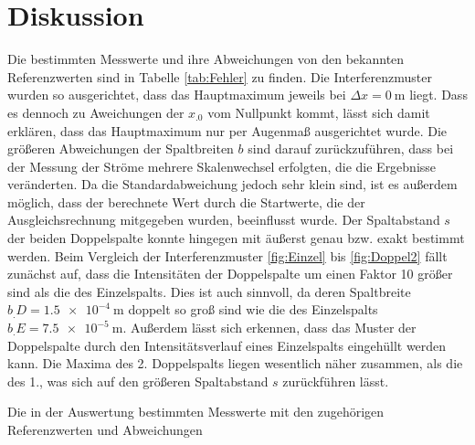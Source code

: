 
\section{Diskussion}
\label{sec:Diskussion}

Die bestimmten Messwerte und ihre Abweichungen von den bekannten Referenzwerten sind in Tabelle \ref{tab:Fehler} zu finden.
Die Interferenzmuster wurden so ausgerichtet, dass das Hauptmaximum jeweils bei $\Delta x =\SI{0}{\metre}$ liegt. Dass es dennoch zu Aweichungen der $x_.0$ vom Nullpunkt kommt, lässt sich damit erklären, dass das Hauptmaximum nur per Augenmaß ausgerichtet wurde.
Die größeren Abweichungen der Spaltbreiten $b$  sind darauf zurückzuführen, dass bei der Messung der Ströme mehrere Skalenwechsel erfolgten, die die Ergebnisse veränderten. Da die Standardabweichung jedoch sehr klein sind, ist es außerdem möglich, dass der berechnete Wert durch die Startwerte, die der Ausgleichsrechnung mitgegeben wurden, beeinflusst wurde.
Der Spaltabstand $s$ der beiden Doppelspalte konnte hingegen mit äußerst genau bzw. exakt bestimmt werden.
Beim Vergleich der Interferenzmuster \ref{fig:Einzel} bis \ref{fig:Doppel2} fällt zunächst auf, dass die Intensitäten der Doppelspalte um einen Faktor 10 größer sind als die des Einzelspalts. Dies ist auch sinnvoll, da deren Spaltbreite $b_.D=\SI{1,5e-4}{\metre}$ doppelt so groß sind wie die des Einzelspalts $b_.E=\SI{7,5e-5}{\metre}$. Außerdem lässt sich erkennen, dass das Muster der Doppelspalte durch den Intensitätsverlauf eines Einzelspalts eingehüllt werden kann.
Die Maxima des 2. Doppelspalts liegen wesentlich näher zusammen, als die des 1., was sich auf den größeren Spaltabstand $s$ zurückführen lässt.

\begin{table}
\centering
\caption{Die in der Auswertung bestimmten Messwerte mit den zugehörigen Referenzwerten und Abweichungen}

\label{tab:Fehler}
\end{table}
